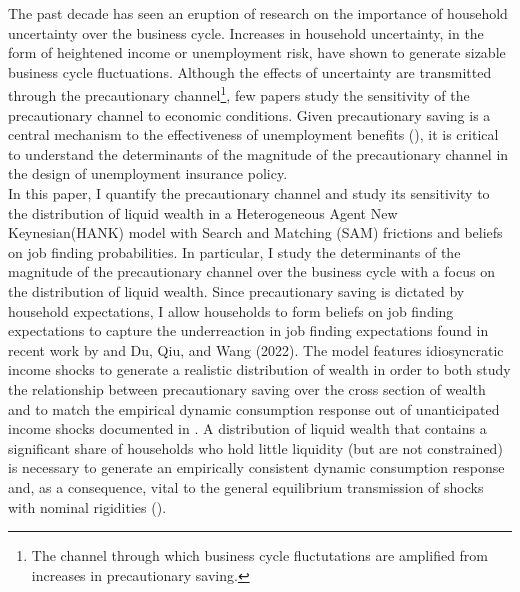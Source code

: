 \documentclass[titlepage]{\econtex}\providecommand{\texname}{Dissertation-Proposal}
\begin{document}








The past decade has seen an eruption of research on the importance of household uncertainty over the business cycle. Increases in household uncertainty, in the form of heightened income or unemployment risk, have shown to generate sizable business cycle fluctuations. Although the effects of uncertainty are transmitted through the precautionary channel\footnote{The channel through which business cycle fluctutations are amplified from increases in precautionary saving.}, few papers study the sensitivity of the precautionary channel to economic conditions. Given precautionary saving is a central mechanism to the effectiveness of unemployment benefits (\cite{Kekre2021}), it is critical to understand the determinants of the magnitude of the precautionary channel in the design of unemployment insurance policy.\\

In this paper, I quantify the precautionary channel and study its sensitivity to the distribution of liquid wealth in a Heterogeneous Agent New Keynesian(HANK) model with Search and Matching (SAM) frictions and beliefs on job finding probabilities. In particular, I study the determinants of the magnitude of the precautionary channel over the business cycle with a focus on the distribution of liquid wealth. Since precautionary saving is dictated by household expectations, I allow households to form beliefs on job finding expectations to capture the underreaction in job finding expectations found in recent work by \cite{mueller2021job} and Du, Qiu, and Wang (2022). The model features idiosyncratic income shocks to generate a realistic distribution of wealth in order to both study the relationship between precautionary saving over the cross section of wealth and to match the empirical dynamic consumption response out of unanticipated income shocks documented in \cite{Fagereng2021}. A distribution of liquid wealth that contains a significant share of households who hold little liquidity (but are not  constrained) is necessary to generate an empirically consistent dynamic consumption response and, as a consequence, vital to the general equilibrium transmission of shocks with nominal rigidities (\cite{auclert2018intertemporal}). \\
\end{document}
